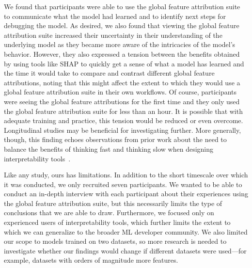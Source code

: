 \documentclass[11pt,dvipdfmx]{article}
\begin{document}
We found that participants were able to use the global feature
attribution suite to communicate what the model had learned and to
identify next steps for debugging the model. As desired, we also found
that viewing the global feature attribution suite increased their
uncertainty in their understanding of the underlying model as they
became more aware of the intricacies of the model's behavior. However,
they also expressed a tension between the benefits obtained by using
tools like SHAP to quickly get a sense of what a model has learned and
the time it would take to compare and contrast different global
feature attributions, noting that this might affect the extent to
which they would use a global feature attribution suite in their own
workflows. Of course, participants were seeing the global feature
attributions for the first time and they only used the global feature
attribution suite for less than an hour. It is possible that with
adequate training and practice, this tension would be reduced or even
overcome. Longitudinal studies may be beneficial for investigating
further. More generally, though, this finding echoes observations from
prior work about the need to balance the benefits of thinking fast and
thinking slow when designing interpretability
tools~\citep{InterpretingInterpretability}.

Like any study, ours has limitations. In addition to the short
timescale over which it was conducted, we only recruited seven
participants. We wanted to be able to conduct an in-depth interview
with each participant about their experiences using the global feature
attribution suite, but this necessarily limits the type of conclusions
that we are able to draw. Furthermore, we focused only on experienced
users of interpretability tools, which further limits the extent to
which we can generalize to the broader ML developer community.  We
also limited our scope to models trained on two datasets, so more
research is needed to investigate whether our findings would change if
different datasets were used---for example, datasets with orders of
magnitude more features. 
\end{document}
